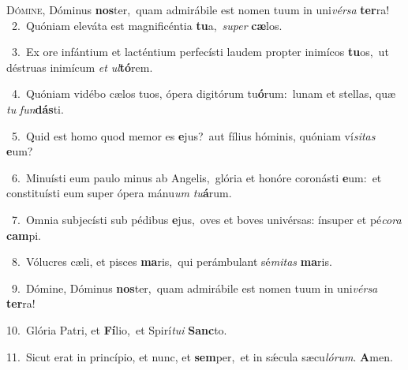 \lettrine{\initial\textcolor{\initialcolor}{D}}{ómine,} Dóminus \textbf{nos}\-ter,~\star quam admirábile est nomen tuum in uni\-\textit{vér}\-\textit{sa} \textbf{ter}\-ra!\\
{\numbfont\textcolor{\numbcolor}{~2.}}~Quóniam eleváta est magnificéntia \textbf{tu}\-a,~\star \textit{su}\-\textit{per} \textbf{cæ}\-los.\par
{\numbfont\textcolor{\numbcolor}{~3.}}~Ex ore infántium et lacténtium perfecísti laudem propter inimícos \textbf{tu}\-os,~\star ut déstruas inimícum \textit{et} \textit{ul}\-\textbf{tó}rem.\par
{\numbfont\textcolor{\numbcolor}{~4.}}~Quóniam vidébo cælos tuos, ópera digitórum tu\-\textbf{ó}\-rum:~\star lunam et stellas, quæ \textit{tu} \textit{fun}\-\textbf{dás}ti.\par
{\numbfont\textcolor{\numbcolor}{~5.}}~Quid est homo quod memor es \textbf{e}\-jus?~\star aut fílius hóminis, quóniam ví\-\textit{si}\-\textit{tas} \textbf{e}\-um?\par
{\numbfont\textcolor{\numbcolor}{~6.}}~Minuísti eum paulo minus ab Angelis,~\dagger glória et honóre coronásti \textbf{e}\-um:~\star et constituísti eum super ópera mánu\textit{um} \textit{tu}\-\textbf{á}rum.\par
{\numbfont\textcolor{\numbcolor}{~7.}}~Omnia subjecísti sub pédibus \textbf{e}\-jus,~\star oves et boves univérsas: ínsuper et pé\-\textit{co}\-\textit{ra} \textbf{cam}\-pi.\par
{\numbfont\textcolor{\numbcolor}{~8.}}~Vólucres cæli, et pisces \textbf{ma}\-ris,~\star qui perámbulant sé\-\textit{mi}\-\textit{tas} \textbf{ma}\-ris.\par
{\numbfont\textcolor{\numbcolor}{~9.}}~Dómine, Dóminus \textbf{nos}\-ter,~\star quam admirábile est nomen tuum in uni\-\textit{vér}\-\textit{sa} \textbf{ter}\-ra!\par
{\numbfont\textcolor{\numbcolor}{10.}}~Glória Patri, et \textbf{Fí}\-lio,~\star et Spirí\-\textit{tu}\-\textit{i} \textbf{Sanc}\-to.\par
{\numbfont\textcolor{\numbcolor}{11.}}~Sicut erat in princípio, et nunc, et \textbf{sem}\-per,~\star et in sǽcula sæcu\-\textit{ló}\-\textit{rum}. \textbf{A}\-men.\par
